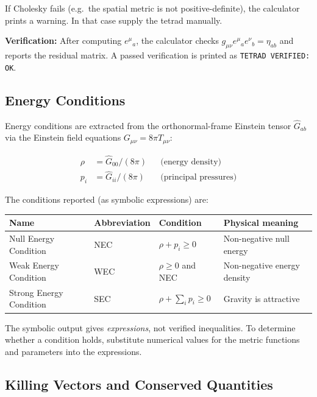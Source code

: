 \documentclass[11pt,a4paper]{article}
\newcommand{\code}[1]{\texttt{\small#1}}
\begin{document}
If Cholesky fails (e.g.\ the spatial metric is not positive-definite), the
calculator prints a warning.  In that case supply the tetrad manually.

\textbf{Verification:} After computing $e^\mu{}_a$, the calculator checks
$g_{\mu\nu}e^\mu{}_a e^\nu{}_b = \eta_{ab}$ and reports the residual matrix.
A passed verification is printed as \code{TETRAD VERIFIED: OK}.

\subsection{Energy Conditions}
\label{sec:adv-ec}

Energy conditions are extracted from the orthonormal-frame Einstein tensor
$\hat{G}_{ab}$ via the Einstein field equations $G_{\mu\nu} = 8\pi T_{\mu\nu}$:

\begin{align*}
  \rho   &= \hat{G}_{00} / (8\pi) & &\text{(energy density)}\\
  p_i    &= \hat{G}_{ii} / (8\pi) & &\text{(principal pressures)}
\end{align*}

The conditions reported (as symbolic expressions) are:

\begin{center}
\begin{tabular}{llll}
  \toprule
  Name & Abbreviation & Condition & Physical meaning \\
  \midrule
  Null Energy Condition & NEC & $\rho + p_i \geq 0$ & Non-negative null energy \\
  Weak Energy Condition & WEC & $\rho \geq 0$ and NEC & Non-negative energy density \\
  Strong Energy Condition & SEC & $\rho + \sum_i p_i \geq 0$ & Gravity is attractive \\
  \bottomrule
\end{tabular}
\end{center}

\begin{notebox}
  The symbolic output gives \emph{expressions}, not verified inequalities.
  To determine whether a condition holds, substitute numerical values for
  the metric functions and parameters into the expressions.
\end{notebox}

\subsection{Killing Vectors and Conserved Quantities}
\label{sec:adv-killing}
\end{document}
